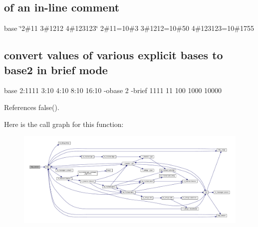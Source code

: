 \subsection*{of an in-\/line comment}

base \textquotesingle{}\char`\"{}2\#11 3\#1212 4\#123123\char`\"{}\textquotesingle{} 2\#11=10\#3 3\#1212=10\#50 4\#123123=10\#1755

\subsection*{convert values of various explicit bases to base2 in brief mode}

base 2\+:1111 3\+:10 4\+:10 8\+:10 16\+:10 -\/obase 2 -\/brief 1111 11 100 1000 10000 

References false().

Here is the call graph for this function\+:
\nopagebreak
\begin{figure}[H]
\begin{center}
\leavevmode
\includegraphics[width=350pt]{base_8f90_a39c21619b08a3c22f19e2306efd7f766_cgraph}
\end{center}
\end{figure}
